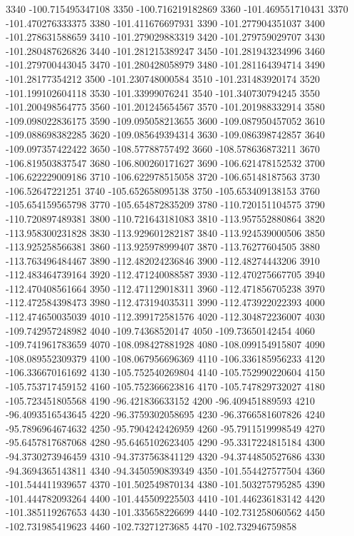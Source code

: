 {3340 -100.715495347108
3350 -100.716219182869
3360 -101.469551710431
3370 -101.470276333375
3380 -101.411676697931
3390 -101.277904351037
3400 -101.278631588659
3410 -101.279029883319
3420 -101.279759029707
3430 -101.280487626826
3440 -101.281215389247
3450 -101.281943234996
3460 -101.279700443045
3470 -101.280428058979
3480 -101.281164394714
3490 -101.28177354212
3500 -101.230748000584
3510 -101.231483920174
3520 -101.199102604118
3530 -101.33999076241
3540 -101.340730794245
3550 -101.200498564775
3560 -101.201245654567
3570 -101.201988332914
3580 -109.098022836175
3590 -109.095058213655
3600 -109.087950457052
3610 -109.088698382285
3620 -109.085649394314
3630 -109.086398742857
3640 -109.097357422422
3650 -108.57788757492
3660 -108.578636873211
3670 -106.819503837547
3680 -106.800260171627
3690 -106.621478152532
3700 -106.622229009186
3710 -106.622978515058
3720 -106.65148187563
3730 -106.52647221251
3740 -105.652658095138
3750 -105.653409138153
3760 -105.654159565798
3770 -105.654872835209
3780 -110.720151104575
3790 -110.720897489381
3800 -110.721643181083
3810 -113.957552880864
3820 -113.958300231828
3830 -113.929601282187
3840 -113.924539000506
3850 -113.925258566381
3860 -113.925978999407
3870 -113.76277604505
3880 -113.763496484467
3890 -112.482024236846
3900 -112.48274443206
3910 -112.483464739164
3920 -112.471240088587
3930 -112.470275667705
3940 -112.470408561664
3950 -112.471129018311
3960 -112.471856705238
3970 -112.472584398473
3980 -112.473194035311
3990 -112.473922022393
4000 -112.474650035039
4010 -112.399172581576
4020 -112.304872236007
4030 -109.742957248982
4040 -109.74368520147
4050 -109.73650142454
4060 -109.741961783659
4070 -108.098427881928
4080 -108.099154915807
4090 -108.089552309379
4100 -108.067956696369
4110 -106.336185956233
4120 -106.336670161692
4130 -105.752540269804
4140 -105.752990220604
4150 -105.753717459152
4160 -105.752366623816
4170 -105.747829732027
4180 -105.723451805568
4190 -96.421836633152
4200 -96.409451889593
4210 -96.4093516543645
4220 -96.3759302058695
4230 -96.3766581607826
4240 -95.7896964674632
4250 -95.7904242426959
4260 -95.7911519998549
4270 -95.6457817687068
4280 -95.6465102623405
4290 -95.3317224815184
4300 -94.3730273946459
4310 -94.3737563841129
4320 -94.3744850527686
4330 -94.3694365143811
4340 -94.3450590839349
4350 -101.554427577504
4360 -101.544411939657
4370 -101.502549870134
4380 -101.503275795285
4390 -101.444782093264
4400 -101.445509225503
4410 -101.446236183142
4420 -101.385119267653
4430 -101.335658226699
4440 -102.731258060562
4450 -102.731985419623
4460 -102.73271273685
4470 -102.732946759858
}
